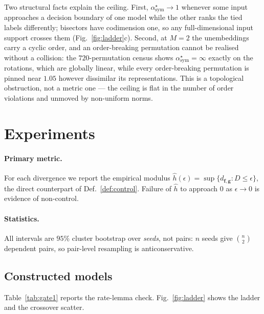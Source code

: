 \documentclass[10pt,letterpaper,twocolumn]{article}
\newcommand{\TODO}[1]{}
\newcommand{\GATE}[1]{\textcolor{blue}{\textsf{\scriptsize (#1)}}}
\newcommand{\bff}{\mathbf{f}}
\newcommand{\bfg}{\mathbf{g}}
\newcommand{\dfg}{d_{\bff,\bfg}}
\theoremstyle{plain}
\theoremstyle{definition}
\theoremstyle{remark}
\begin{document}
Two structural facts explain the ceiling. First,
$\alpha^{\star}_{\mathrm{sym}}\!\to\!1$ whenever some input approaches a
decision boundary of one model while the other ranks the tied labels
differently; bisectors have codimension one, so any full-dimensional input
support crosses them (Fig.~\ref{fig:ladder}c). Second, at $M=2$ the
unembeddings carry a cyclic order, and an order-breaking permutation cannot be
realised without a collision: the $720$-permutation census shows
$\alpha^{\star}_{\mathrm{sym}}=\infty$ exactly on the rotations, which are
globally linear, while every order-breaking permutation is pinned near $1.05$
however dissimilar its representations. This is a topological obstruction, not
a metric one --- the ceiling is flat in the number of order violations and
unmoved by non-uniform norms.

\TODO{Proving $\alpha_{0}<\infty$ unconditionally, or exhibiting a family with
$\alpha^{\star}_{\mathrm{sym}}$ unbounded and $\dfg$ bounded below, would close
the characterisation. \GATE{G2}}

\section{Experiments}
\label{sec:experiments}

\paragraph{Primary metric.}
For each divergence we report the empirical modulus
$\hat h(\epsilon)=\sup\{\dfg:D\le\epsilon\}$, the direct counterpart of
Def.~\ref{def:control}. Failure of $\hat h$ to approach $0$ as $\epsilon\to0$ is
evidence of non-control.

\paragraph{Statistics.}
All intervals are $95\%$ cluster bootstrap over \emph{seeds}, not pairs: $n$
seeds give $\binom{n}{2}$ dependent pairs, so pair-level resampling is
anticonservative. \TODO{state $n$ per setting}

\subsection{Constructed models}
\label{sec:exp-constructed}

Table~\ref{tab:gate1} reports the rate-lemma check. Fig.~\ref{fig:ladder}
shows the ladder and the crossover scatter.
\end{document}
